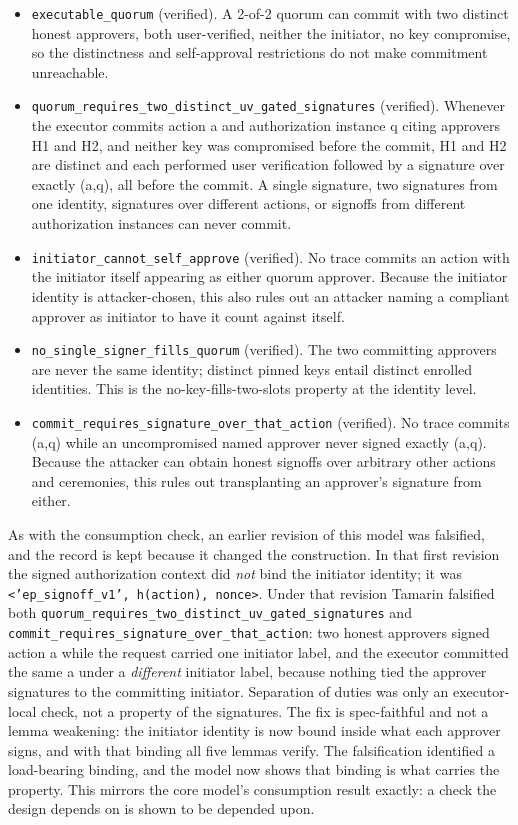 \documentclass[11pt]{article}
\newcommand{\code}[1]{\texttt{#1}}
\begin{document}
\begin{itemize}[leftmargin=*]
\item \code{executable\_quorum} (verified). A 2-of-2 quorum can commit with two
distinct honest approvers, both user-verified, neither the initiator, no key
compromise, so the distinctness and self-approval restrictions do not make
commitment unreachable.
\item \code{quorum\_requires\_two\_distinct\_uv\_gated\_signatures} (verified).
Whenever the executor commits action a and authorization instance q citing
approvers H1 and H2, and neither key was compromised before the commit, H1 and H2
are distinct and each performed user verification followed by a signature over
exactly (a,q), all before the commit. A single signature, two signatures from one
identity, signatures over different actions, or signoffs from different
authorization instances can never commit.
\item \code{initiator\_cannot\_self\_approve} (verified). No trace commits an
action with the initiator itself appearing as either quorum approver. Because the
initiator identity is attacker-chosen, this also rules out an attacker naming a
compliant approver as initiator to have it count against itself.
\item \code{no\_single\_signer\_fills\_quorum} (verified). The two committing
approvers are never the same identity; distinct pinned keys entail distinct
enrolled identities. This is the no-key-fills-two-slots property at the identity
level.
\item \code{commit\_requires\_signature\_over\_that\_action} (verified). No trace
commits (a,q) while an uncompromised named approver never signed exactly (a,q).
Because the attacker can obtain honest signoffs over arbitrary other actions and
ceremonies, this rules out transplanting an approver's signature from either.
\end{itemize}

As with the consumption check, an earlier revision of this model was falsified, and
the record is kept because it changed the construction. In that first revision the
signed authorization context did \emph{not} bind the initiator identity; it was
\code{<'ep\_signoff\_v1', h(action), nonce>}. Under that revision Tamarin falsified
both \code{quorum\_requires\_two\_distinct\_uv\_gated\_signatures} and
\code{commit\_requires\_signature\_over\_that\_action}: two honest approvers signed
action a while the request carried one initiator label, and the executor committed
the same a under a \emph{different} initiator label, because nothing tied the
approver signatures to the committing initiator. Separation of duties was only an
executor-local check, not a property of the signatures. The fix is spec-faithful
and not a lemma weakening: the initiator identity is now bound inside what each
approver signs, and with that binding all five lemmas verify. The falsification
identified a load-bearing binding, and the model now shows that binding is what
carries the property. This mirrors the core model's consumption result exactly: a
check the design depends on is shown to be depended upon.
\end{document}

